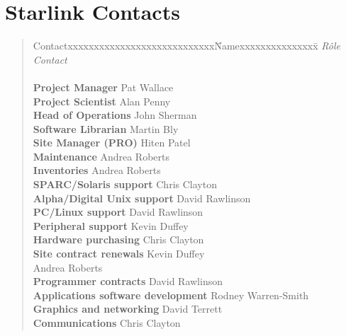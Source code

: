 \appendix

\newpage

\section {\label{starlinkcontacts}Starlink Contacts}

\begin{quote}
\begin{tabbing}
Contactxxxxxxxxxxxxxxxxxxxxxxxxxxxx\=Namexxxxxxxxxxxxxxx\=\kill
{\em R\^{o}le}                   \> {\em Contact}  \\
\\
{\bf Project Manager}            \> Pat Wallace     \\
{\bf Project Scientist}          \> Alan Penny      \\
{\bf Head of Operations}         \> John Sherman    \\
{\bf Software Librarian}         \> Martin Bly      \\
{\bf Site Manager (PRO)}         \> Hiten Patel     \\
{\bf Maintenance}                \> Andrea Roberts  \\
{\bf Inventories}                \> Andrea Roberts  \\
{\bf SPARC/Solaris support}      \> Chris Clayton   \\
{\bf Alpha/Digital Unix support} \> David Rawlinson \\
{\bf PC/Linux support}           \> David Rawlinson \\
{\bf Peripheral support}         \> Kevin Duffey    \\
{\bf Hardware purchasing}        \> Chris Clayton   \\
{\bf Site contract renewals}     \> Kevin Duffey    \\
                                 \> Andrea Roberts  \\
{\bf Programmer contracts}        \> David Rawlinson  \\
{\bf Applications software development}\> Rodney Warren-Smith  \\
{\bf Graphics and networking}    \> David Terrett   \\
{\bf Communications}             \> Chris Clayton  
\end{tabbing}
\end{quote}

